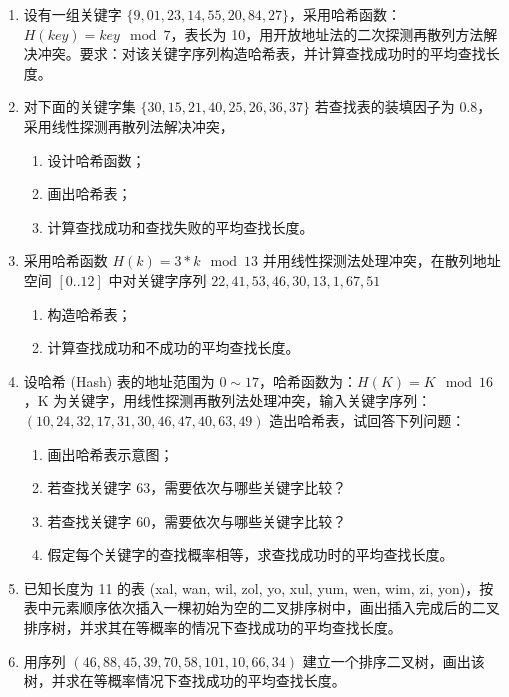 \documentclass[12pt, a4paper]{article}
\begin{document}
\begin{enumerate}
	\item 设有一组关键字 $\{9, 01, 23, 14, 55, 20, 84, 27\}$，采用哈希函数：$H(key)=key \mod 7$，表长为 10，用开放地址法的二次探测再散列方法解决冲突。要求：对该关键字序列构造哈希表，并计算查找成功时的平均查找长度。

	\item 对下面的关键字集 $\{30, 15, 21, 40, 25, 26, 36, 37\}$ 若查找表的装填因子为 0.8，采用线性探测再散列法解决冲突，
	      \begin{enumerate}
		      \item 设计哈希函数；
		      \item 画出哈希表；
		      \item 计算查找成功和查找失败的平均查找长度。
	      \end{enumerate}

	\item 采用哈希函数 $H(k)=3*k \mod 13$ 并用线性探测法处理冲突，在散列地址空间 $[0..12]$ 中对关键字序列 $22, 41, 53, 46, 30, 13, 1, 67, 51$
	      \begin{enumerate}
		      \item 构造哈希表；
		      \item 计算查找成功和不成功的平均查找长度。
	      \end{enumerate}

	\item 设哈希 (Hash) 表的地址范围为 $0 \sim 17$，哈希函数为：$H(K)=K \mod 16$，K 为关键字，用线性探测再散列法处理冲突，输入关键字序列：$(10, 24, 32, 17, 31, 30, 46, 47, 40, 63, 49)$ 造出哈希表，试回答下列问题：
	      \begin{enumerate}
		      \item 画出哈希表示意图；
		      \item 若查找关键字 63，需要依次与哪些关键字比较？
		      \item 若查找关键字 60，需要依次与哪些关键字比较？
		      \item 假定每个关键字的查找概率相等，求查找成功时的平均查找长度。
	      \end{enumerate}

	\item 已知长度为 11 的表 (xal, wan, wil, zol, yo, xul, yum, wen, wim, zi, yon)，按表中元素顺序依次插入一棵初始为空的二叉排序树中，画出插入完成后的二叉排序树，并求其在等概率的情况下查找成功的平均查找长度。

	\item 用序列 $(46, 88, 45, 39, 70, 58, 101, 10, 66, 34)$ 建立一个排序二叉树，画出该树，并求在等概率情况下查找成功的平均查找长度。


\end{enumerate}
\end{document}
